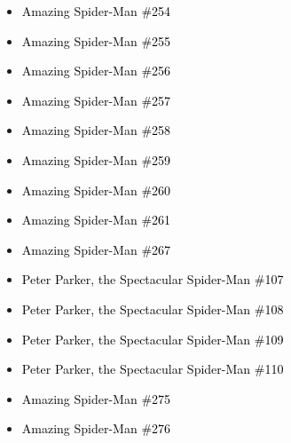 \documentclass[12pt]{article}
\newcommand{\checkbox}{\raisebox{0.0ex}{\fbox{\rule{0ex}{1.5ex} \rule{1.5ex}{0ex}}}}
\begin{document}
\begin{center}
\begin{tcolorbox}[colback=white!95!gray, colframe=black, width=0.9\textwidth, arc=4mm, auto outer arc, boxrule=0.8pt]
\begin{itemize}[left=0pt,label={\checkbox}]
    \item \textcolor{black}{Amazing Spider-Man \#254}
    \item \textcolor{black}{Amazing Spider-Man \#255}
    \item \textcolor{black}{Amazing Spider-Man \#256}
    \item \textcolor{black}{Amazing Spider-Man \#257}
    \item \textcolor{black}{Amazing Spider-Man \#258}
    \item \textcolor{black}{Amazing Spider-Man \#259}
    \item \textcolor{black}{Amazing Spider-Man \#260}
    \item \textcolor{black}{Amazing Spider-Man \#261}
    \item \textcolor{black}{Amazing Spider-Man \#267}
    \item \textcolor{black}{Peter Parker, the Spectacular Spider-Man \#107}
    \item \textcolor{black}{Peter Parker, the Spectacular Spider-Man \#108}
    \item \textcolor{black}{Peter Parker, the Spectacular Spider-Man \#109}
    \item \textcolor{black}{Peter Parker, the Spectacular Spider-Man \#110}
    \item \textcolor{black}{Amazing Spider-Man \#275}
    \item \textcolor{black}{Amazing Spider-Man \#276}
\end{itemize}
\end{tcolorbox}
\end{center}
\end{document}
